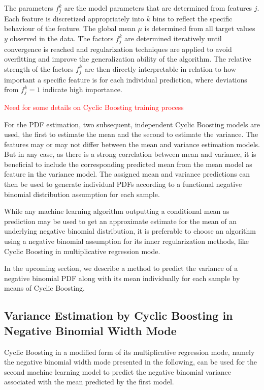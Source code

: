 \documentclass[BCOR=1mm, DIV=calc,10pt,
twoside=true,
twocolumn,
headings=normal]{scrartcl}
\begin{document}
The parameters $f^k_j$ are the model parameters that are determined from features $j$. Each feature is discretized appropriately into $k$ bins to reflect the specific behaviour of the feature. The global mean $\mu$ is determined from all target values $y$ observed in the data. The factors $f^k_j$ are determined iteratively until convergence is reached and regularization techniques are applied to avoid overfitting and improve the generalization ability of the algorithm. The relative strength of the factors  $f^k_j$ are then directly interpretable in relation to how important a specific feature is for each individual prediction, where deviations from  $f^k_j=1$ indicate high importance.

\textcolor{red}{Need for some details on Cyclic Boosting training process}

For the PDF estimation, two subsequent, independent Cyclic Boosting models are used, the first to estimate the mean and the second to estimate the variance. The features may or may not differ between the mean and variance estimation models. But in any case, as there is a strong correlation between mean and variance, it is beneficial to include the corresponding predicted mean from the mean model as feature in the variance model. The assigned mean and variance predictions can then be used to generate individual PDFs according to a functional negative binomial distribution assumption for each sample.

While any machine learning algorithm outputting a conditional mean as prediction may be used to get an approximate estimate for the mean of an underlying negative binomial distribution, it is preferable to choose an algorithm using a negative binomial assumption for its inner regularization methods, like Cyclic Boosting in multiplicative regression mode.

In the upcoming section, we describe a method to predict the variance of a negative binomial PDF along with its mean individually for each sample by means of Cyclic Boosting.

\subsection{Variance Estimation by Cyclic Boosting in Negative Binomial Width Mode}

Cyclic Boosting in a modified form of its multiplicative regression mode, namely the negative binomial width mode presented in the following, can be used for the second machine learning model to predict the negative binomial variance associated with the mean predicted by the first model.
\end{document}
